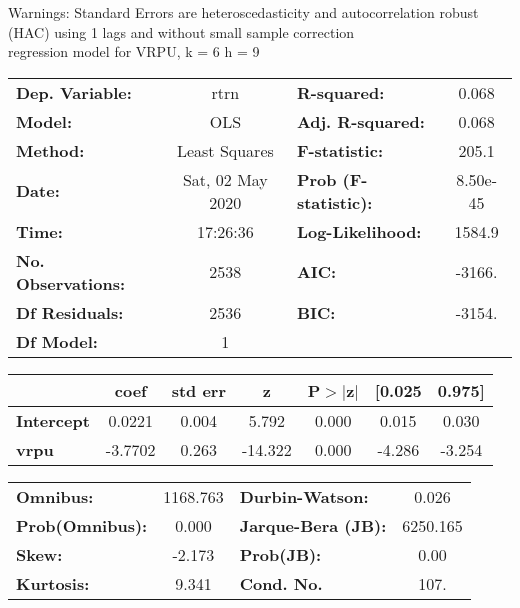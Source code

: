 Warnings: \newline
 [1] Standard Errors are heteroscedasticity and autocorrelation robust (HAC) using 1 lags and without small sample correction\\ 

regression model for VRPU, k = 6 h = 9\begin{center}
\begin{tabular}{lclc}
\toprule
\textbf{Dep. Variable:}    &       rtrn       & \textbf{  R-squared:         } &     0.068   \\
\textbf{Model:}            &       OLS        & \textbf{  Adj. R-squared:    } &     0.068   \\
\textbf{Method:}           &  Least Squares   & \textbf{  F-statistic:       } &     205.1   \\
\textbf{Date:}             & Sat, 02 May 2020 & \textbf{  Prob (F-statistic):} &  8.50e-45   \\
\textbf{Time:}             &     17:26:36     & \textbf{  Log-Likelihood:    } &    1584.9   \\
\textbf{No. Observations:} &        2538      & \textbf{  AIC:               } &    -3166.   \\
\textbf{Df Residuals:}     &        2536      & \textbf{  BIC:               } &    -3154.   \\
\textbf{Df Model:}         &           1      & \textbf{                     } &             \\
\bottomrule
\end{tabular}
\begin{tabular}{lcccccc}
                   & \textbf{coef} & \textbf{std err} & \textbf{z} & \textbf{P$> |$z$|$} & \textbf{[0.025} & \textbf{0.975]}  \\
\midrule
\textbf{Intercept} &       0.0221  &        0.004     &     5.792  &         0.000        &        0.015    &        0.030     \\
\textbf{vrpu}      &      -3.7702  &        0.263     &   -14.322  &         0.000        &       -4.286    &       -3.254     \\
\bottomrule
\end{tabular}
\begin{tabular}{lclc}
\textbf{Omnibus:}       & 1168.763 & \textbf{  Durbin-Watson:     } &    0.026  \\
\textbf{Prob(Omnibus):} &   0.000  & \textbf{  Jarque-Bera (JB):  } & 6250.165  \\
\textbf{Skew:}          &  -2.173  & \textbf{  Prob(JB):          } &     0.00  \\
\textbf{Kurtosis:}      &   9.341  & \textbf{  Cond. No.          } &     107.  \\
\bottomrule
\end{tabular}
\end{center}

